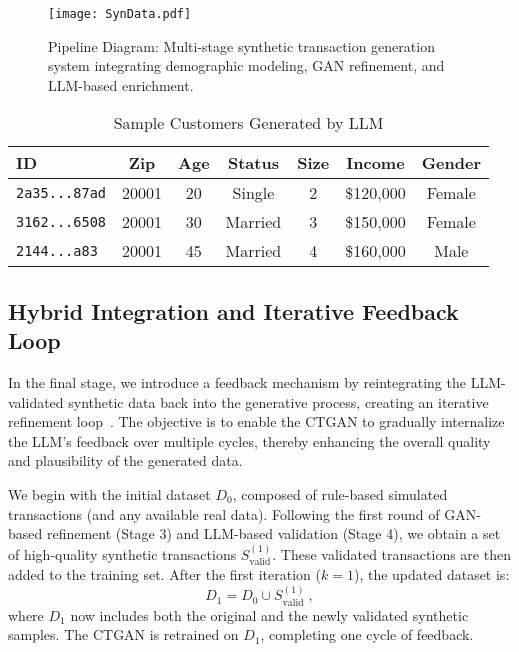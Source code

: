 \documentclass[conference]{IEEEtran}
\begin{document}
\begin{figure}[htbp]
\centering
\texttt{[image: SynData.pdf]}
\caption{Pipeline Diagram: Multi-stage synthetic transaction generation system integrating demographic modeling, GAN refinement, and LLM-based enrichment.}
\label{fig:pipeline}
\end{figure}

\begin{table*}[htbp]
\centering
\small
\renewcommand{\arraystretch}{1.3}
\caption{Sample Customers Generated by LLM}
\label{tab:deepseek_customers}
\begin{tabular}{|l|c|c|c|c|c|c|}
\hline
\textbf{ID} & \textbf{Zip} & \textbf{Age} & \textbf{Status} & \textbf{Size} & \textbf{Income} & \textbf{Gender} \\
\hline
\texttt{2a35...87ad} & 20001 & 20 & Single  & 2 & \$120,000 & Female \\
\hline
\texttt{3162...6508} & 20001 & 30 & Married & 3 & \$150,000 & Female \\
\hline
\texttt{2144...a83}  & 20001 & 45 & Married & 4 & \$160,000 & Male   \\
\hline
\end{tabular}
\end{table*}





\subsection{Hybrid Integration and Iterative Feedback Loop}
In the final stage, we introduce a feedback mechanism by reintegrating the LLM-validated synthetic data back into the generative process, creating an iterative refinement loop~\cite{brown2020}. The objective is to enable the CTGAN to gradually internalize the LLM's feedback over multiple cycles, thereby enhancing the overall quality and plausibility of the generated data.

We begin with the initial dataset \( D_0 \), composed of rule-based simulated transactions (and any available real data). Following the first round of GAN-based refinement (Stage 3) and LLM-based validation (Stage 4), we obtain a set of high-quality synthetic transactions \( S_{\text{valid}}^{(1)} \). These validated transactions are then added to the training set. After the first iteration (\( k = 1 \)), the updated dataset is:
\begin{equation}
D_{1} = D_{0} \cup S_{\text{valid}}^{(1)}~,
\label{eq:augment}
\end{equation}
where \( D_1 \) now includes both the original and the newly validated synthetic samples. The CTGAN is retrained on \( D_1 \), completing one cycle of feedback. 
\end{document}
